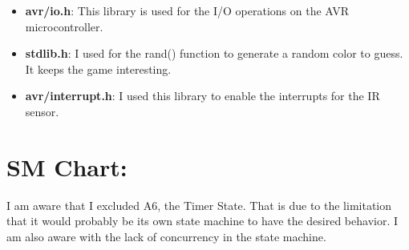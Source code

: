 \documentclass[12pt]{article}
\begin{document}
\begin{itemize}
  \item \textbf{avr/io.h}:
    This library is used for the I/O operations on the AVR microcontroller.
  \item \textbf{stdlib.h}:
    I used for the rand() function to generate a random color to guess.
    It keeps the game interesting.
  \item \textbf{avr/interrupt.h}:
    I used this library to enable the interrupts for the IR sensor.
\end{itemize} 
 
\pagebreak
\section{SM Chart:}


  I am aware that I excluded A6, the Timer State.
  That is due to the limitation that it would probably be its own state machine to have the desired behavior.
  I am also aware with the lack of concurrency in the state machine.
  \pagebreak
\end{document}
